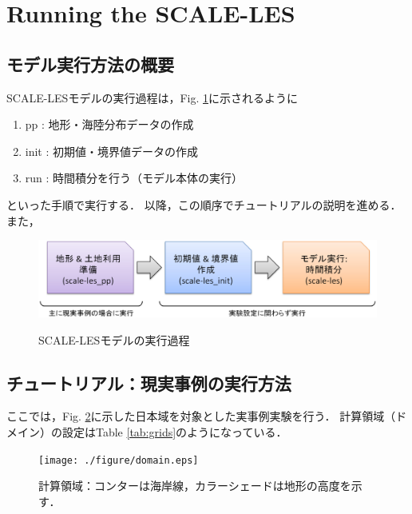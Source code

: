 \section{Running the SCALE-LES}

\subsection{モデル実行方法の概要}

SCALE-LESモデルの実行過程は，Fig. \ref{fig:howto}に示されるように
\begin{enumerate}
\item pp : 地形・海陸分布データの作成
\item init : 初期値・境界値データの作成
\item run : 時間積分を行う（モデル本体の実行）
\end{enumerate}
といった手順で実行する．
以降，この順序でチュートリアルの説明を進める．
また，

\begin{figure}[t]
\begin{center}
  \includegraphics[width=0.9\hsize]{./figure/how_to_run.eps}\\
  \caption{SCALE-LESモデルの実行過程}
  \label{fig:howto}
\end{center}
\end{figure}



\subsection{チュートリアル：現実事例の実行方法}

ここでは，Fig. \ref{fig:domain}に示した日本域を対象とした実事例実験を行う．
計算領域（ドメイン）の設定はTable \ref{tab:grids}のようになっている．

\begin{figure}[t]
\begin{center}
  \texttt{[image: ./figure/domain.eps]}\\
  \caption{計算領域：コンターは海岸線，カラーシェードは地形の高度を示す．}
  \label{fig:domain}
\end{center}
\end{figure}

